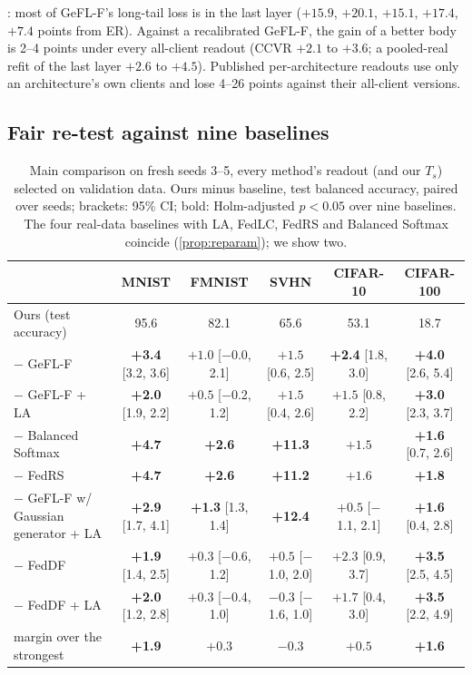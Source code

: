 \documentclass[10pt]{article}
\theoremstyle{plain}
\theoremstyle{definition}
\newcommand{\ER}{\textsc{ER}}
\newcommand{\pos}[1]{\textbf{#1}}
\begin{document}
: most of GeFL-F's long-tail loss is in the last layer ($+15.9$, $+20.1$, $+15.1$, $+17.4$, $+7.4$
points from \ER). Against a recalibrated GeFL-F, the gain of a better body is 2--4 points under every all-client
readout (CCVR $+2.1$ to $+3.6$; a pooled-real refit of the last layer $+2.6$ to $+4.5$). Published per-architecture
readouts use only an architecture's own clients and lose 4--26 points against their all-client versions.

\subsection{Fair re-test against nine baselines}\label{sec:fair}

\begin{table}[t]
\centering\small
\caption{Main comparison on fresh seeds 3--5, every method's readout (and our $T_s$) selected on validation data.
Ours minus baseline, test balanced accuracy, paired over seeds; brackets: 95\% CI; bold: Holm-adjusted $p<0.05$ over
nine baselines. The four real-data baselines with LA, FedLC, FedRS and Balanced Softmax coincide
(\cref{prop:reparam}); we show two.}
\label{tab:fair}
\setlength{\tabcolsep}{4pt}
\begin{tabular}{lccccc}
\toprule
& MNIST & FMNIST & SVHN & CIFAR-10 & CIFAR-100\\
\midrule
Ours (test accuracy) & 95.6 & 82.1 & 65.6 & 53.1 & 18.7\\
\midrule
$-$ GeFL-F & \pos{+3.4} {\scriptsize[3.2, 3.6]} & $+1.0$ {\scriptsize[$-$0.0, 2.1]} & $+1.5$ {\scriptsize[0.6, 2.5]} & \pos{+2.4} {\scriptsize[1.8, 3.0]} & \pos{+4.0} {\scriptsize[2.6, 5.4]}\\
$-$ GeFL-F + LA & \pos{+2.0} {\scriptsize[1.9, 2.2]} & $+0.5$ {\scriptsize[$-$0.2, 1.2]} & $+1.5$ {\scriptsize[0.4, 2.6]} & $+1.5$ {\scriptsize[0.8, 2.2]} & \pos{+3.0} {\scriptsize[2.3, 3.7]}\\
$-$ Balanced Softmax~\cite{ren2020bsm} & \pos{+4.7} & \pos{+2.6} & \pos{+11.3} & $+1.5$ & \pos{+1.6} {\scriptsize[0.7, 2.6]}\\
$-$ FedRS & \pos{+4.7} & \pos{+2.6} & \pos{+11.2} & $+1.6$ & \pos{+1.8}\\
$-$ GeFL-F w/ Gaussian generator + LA & \pos{+2.9} {\scriptsize[1.7, 4.1]} & \pos{+1.3} {\scriptsize[1.3, 1.4]} & \pos{+12.4} & $+0.5$ {\scriptsize[$-$1.1, 2.1]} & \pos{+1.6} {\scriptsize[0.4, 2.8]}\\
$-$ FedDF & \pos{+1.9} {\scriptsize[1.4, 2.5]} & $+0.3$ {\scriptsize[$-$0.6, 1.2]} & $+0.5$ {\scriptsize[$-$1.0, 2.0]} & $+2.3$ {\scriptsize[0.9, 3.7]} & \pos{+3.5} {\scriptsize[2.5, 4.5]}\\
$-$ FedDF + LA & \pos{+2.0} {\scriptsize[1.2, 2.8]} & $+0.3$ {\scriptsize[$-$0.4, 1.0]} & $-0.3$ {\scriptsize[$-$1.6, 1.0]} & $+1.7$ {\scriptsize[0.4, 3.0]} & \pos{+3.5} {\scriptsize[2.2, 4.9]}\\
\midrule
margin over the strongest & \pos{+1.9} & $+0.3$ & $-0.3$ & $+0.5$ & \pos{+1.6}\\
\bottomrule
\end{tabular}
\end{table}
\end{document}
